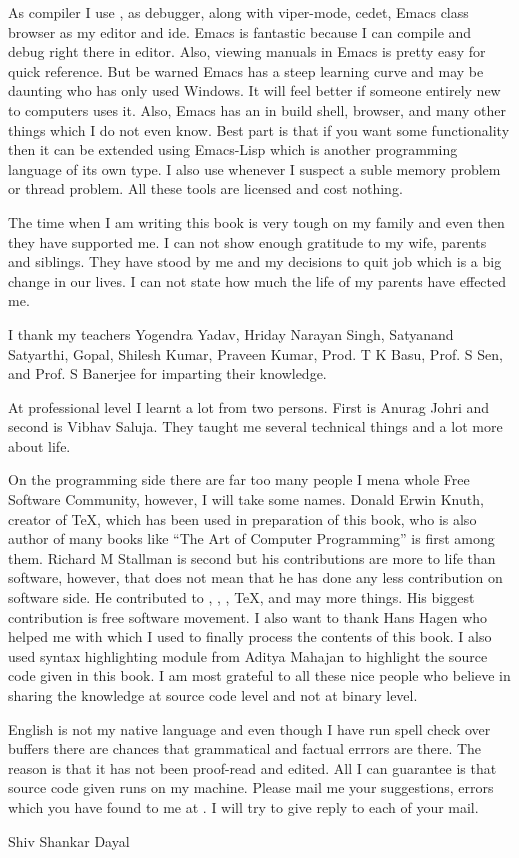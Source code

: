 As compiler I use ,  as debugger, 
along with viper-mode, cedet, Emacs class browser as my editor and
ide. Emacs is fantastic because I can compile and debug right there in
editor. Also, viewing manuals in Emacs is pretty easy for quick
reference. But be warned Emacs has a steep learning curve and may be
daunting who has only used Windows. It will feel better if someone
entirely new to computers uses it. Also, Emacs has an in build shell,
browser, and many other things which I do not even know. Best part is
that if you want some functionality then it can be extended using
Emacs-Lisp which is another programming language of its own type.
I also use  whenever I suspect a suble memory problem
or thread problem. All these tools are licensed and cost nothing.

\subject{Acknowledgements}
The time when I am writing this book is very tough on my family and
even then they have supported me. I can not show enough gratitude to
my wife, parents and siblings. They have stood by me and my decisions
to quit job which is a big change in our lives. I can not state how
much the life of my parents have effected me.

I thank my teachers Yogendra Yadav, Hriday Narayan Singh, Satyanand
Satyarthi, Gopal, Shilesh Kumar, Praveen Kumar, Prod. T K Basu, Prof. S
Sen, and Prof. S Banerjee for imparting their knowledge.

At professional level I learnt a lot from two persons. First is Anurag
Johri and second is Vibhav Saluja. They taught me several technical
things and a lot more about life.

On the programming side there are far too many people I mena whole
Free Software Community, however, I will take some names. Donald Erwin
Knuth, creator of \TeX{}, which has been used in preparation of this
book, who is also author of many books like ``The Art of Computer
Programming'' is first among them. Richard M Stallman is second but
his contributions are more to life than software, however, that does
not mean that he has done any less contribution on software side. He
contributed to , , , \TeX{},
 and may more things. His biggest contribution is free
software movement. I also want to thank Hans Hagen who helped me with
\ConTeXt{} which I used to finally process the contents of this book.
I also used  syntax highlighting module from Aditya Mahajan
to highlight the source code given in this book. I am most grateful to
all these nice people who believe in sharing the knowledge at source
code level and not at binary level.

English is not my native language and even though I have run spell
check over buffers there are chances that grammatical and factual
errrors are there. The reason is that it has not been proof-read and
edited. All I can guarantee is that source code given runs on my
machine. Please mail me your suggestions, errors which you have found
to me at \from[email]. I will try to give
reply to each of your mail.

\startalignment[flushright]
Shiv Shankar Dayal
\stopalignment


